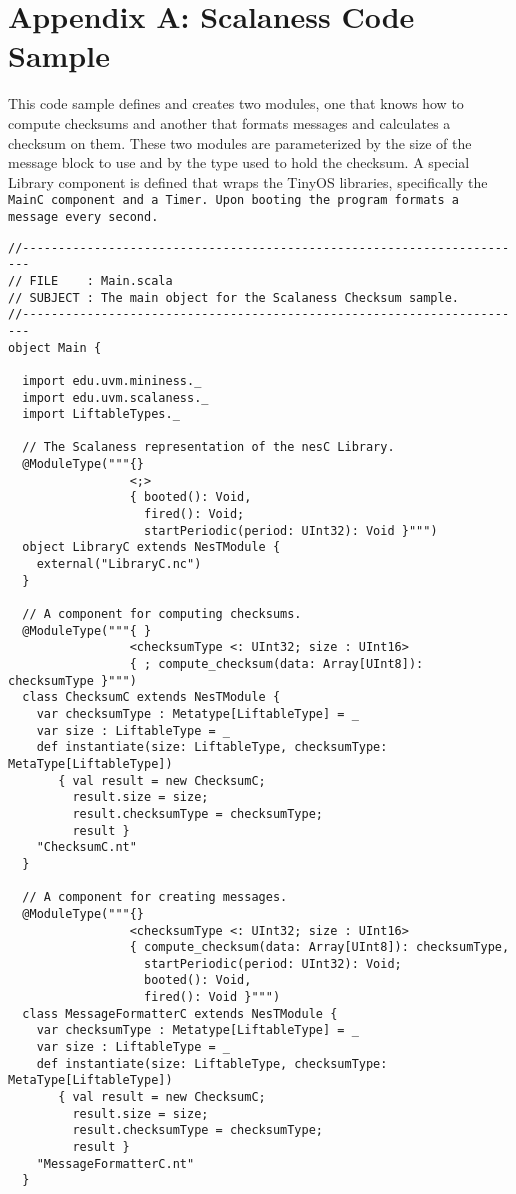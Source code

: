 \section*{Appendix A: Scalaness Code Sample}

This code sample defines and creates two modules, one that knows how to compute checksums and
another that formats messages and calculates a checksum on them. These two modules are
parameterized by the size of the message block to use and by the type used to hold the checksum.
A special Library component is defined that wraps the TinyOS libraries, specifically the
\tt{MainC} component and a Timer. Upon booting the program formats a message every second.

{\scriptsize
\begin{verbatim}
//-----------------------------------------------------------------------
// FILE    : Main.scala
// SUBJECT : The main object for the Scalaness Checksum sample.
//-----------------------------------------------------------------------
object Main {

  import edu.uvm.mininess._
  import edu.uvm.scalaness._
  import LiftableTypes._

  // The Scalaness representation of the nesC Library.
  @ModuleType("""{}
                 <;>
                 { booted(): Void,
                   fired(): Void;
                   startPeriodic(period: UInt32): Void }""")
  object LibraryC extends NesTModule {
    external("LibraryC.nc")
  }

  // A component for computing checksums.
  @ModuleType("""{ }
                 <checksumType <: UInt32; size : UInt16> 
                 { ; compute_checksum(data: Array[UInt8]): checksumType }""")
  class ChecksumC extends NesTModule {
    var checksumType : Metatype[LiftableType] = _
    var size : LiftableType = _
    def instantiate(size: LiftableType, checksumType: MetaType[LiftableType])
       { val result = new ChecksumC; 
         result.size = size; 
         result.checksumType = checksumType; 
         result }
    "ChecksumC.nt"
  }

  // A component for creating messages.
  @ModuleType("""{}
                 <checksumType <: UInt32; size : UInt16>
                 { compute_checksum(data: Array[UInt8]): checksumType,
                   startPeriodic(period: UInt32): Void;
                   booted(): Void,
                   fired(): Void }""")
  class MessageFormatterC extends NesTModule {
    var checksumType : Metatype[LiftableType] = _
    var size : LiftableType = _
    def instantiate(size: LiftableType, checksumType: MetaType[LiftableType])
       { val result = new ChecksumC; 
         result.size = size; 
         result.checksumType = checksumType; 
         result }
    "MessageFormatterC.nt"
  }


\end{verbatim}}
